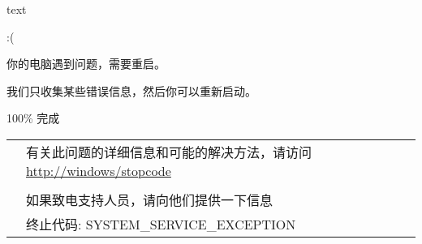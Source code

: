 \documentclass[aspectratio = 169, xcolor = x11names]{ctexbeamer}
\begin{document}
\begin{beamercolorbox}{text}

  \fontsize{80}{80}\selectfont
  \hspace{-0.2em}:(

  你的电脑遇到问题，需要重启。

  我们只收集某些错误信息，然后你可以重新启动。

  \mbox{}

  100\% 完成

  \mbox{}

  \begin{tabu}{cl}
     & 有关此问题的详细信息和可能的解决方法，请访问\url{http://windows/stopcode}\\
                                                                                & \\
                                                                                & 如果致电支持人员，请向他们提供一下信息\\
                                                                                & 终止代码: SYSTEM\_SERVICE\_EXCEPTION
  \end{tabu}
\end{beamercolorbox}
\end{document}
